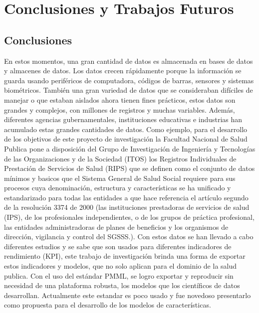 \chapter{Conclusiones y Trabajos Futuros}

 \section{Conclusiones}

En estos momentos, una gran cantidad de datos es almacenada en bases de datos y almacenes de datos. Los datos crecen rápidamente porque la información se guarda usando periféricos de computadora, códigos de barras, sensores y sistemas biométricos. También una gran variedad de datos que se consideraban difíciles de manejar o que estaban aislados ahora tienen fines prácticos, estos datos son  grandes y complejos, con millones de registros y muchas variables. Además, diferentes agencias gubernamentales, instituciones educativas e industrias han acumulado estas grandes cantidades de datos. Como ejemplo, para el desarrollo de los objetivos de este proyecto de investigación la Facultad Nacional de Salud Publica  pone a disposición del Grupo de Investigación de Ingeniería y Tecnologías de las Organizaciones y de la Sociedad (ITOS) los Registros Individuales de Prestación de Servicios de Salud (RIPS) que se definen como el conjunto de datos mínimos y basicos  que el Sistema General de Salud Social requiere para sus procesos cuya denominación, estructura y características se ha unificado y estandarizado para todas las entidades a que hace referencia el artículo segundo de la resolución 3374 de 2000 (las instituciones prestadoras de servicios de salud (IPS), de los profesionales independientes, o de los grupos de práctica profesional, las entidades administradoras de planes de beneficios y los organismos de dirección, vigilancia y control del SGSSS.). Con estos datos se han llevado a cabo diferentes estudios y se sabe que son usados para diferentes indicadores de rendimiento (KPI), este trabajo de investigación brinda una forma de exportar estos indicadores y modelos, que no solo aplican para el dominio de la salud publica. Con el uso del estándar PMML, se logro exportar y reproducir sin necesidad de una plataforma robusta, los modelos que los científicos de datos desarrollan. Actualmente este estandar es poco usado y fue novedoso presentarlo como propuesta para el desarrollo de los modelos de características.\\

